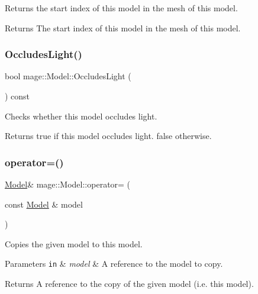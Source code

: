 Returns the start index of this model in the mesh of this model.

\begin{DoxyReturn}{Returns}
The start index of this model in the mesh of this model. 
\end{DoxyReturn}
\hypertarget{classmage_1_1_model_a2ab5542819b80d58f349128a6c0194b5}{}\label{classmage_1_1_model_a2ab5542819b80d58f349128a6c0194b5} 
\subsubsection{\texorpdfstring{Occludes\+Light()}{OccludesLight()}}
{\footnotesize\ttfamily bool mage\+::\+Model\+::\+Occludes\+Light (\begin{DoxyParamCaption}{ }\end{DoxyParamCaption}) const\hspace{0.3cm}{\ttfamily [noexcept]}}

Checks whether this model occludes light.

\begin{DoxyReturn}{Returns}
{\ttfamily true} if this model occludes light. {\ttfamily false} otherwise. 
\end{DoxyReturn}
\hypertarget{classmage_1_1_model_a563515c64ec39cfcda9f6ca37576391b}{}\label{classmage_1_1_model_a563515c64ec39cfcda9f6ca37576391b} 
\subsubsection{\texorpdfstring{operator=()}{operator=()}\hspace{0.1cm}{\footnotesize\ttfamily [1/2]}}
{\footnotesize\ttfamily \hyperlink{classmage_1_1_model}{Model}\& mage\+::\+Model\+::operator= (\begin{DoxyParamCaption}\item[{const \hyperlink{classmage_1_1_model}{Model} \&}]{model }\end{DoxyParamCaption})\hspace{0.3cm}{\ttfamily [delete]}}

Copies the given model to this model.


\begin{DoxyParams}[1]{Parameters}
\mbox{\tt in}  & {\em model} & A reference to the model to copy. \\
\hline
\end{DoxyParams}
\begin{DoxyReturn}{Returns}
A reference to the copy of the given model (i.\+e. this model). 
\end{DoxyReturn}
\hypertarget{classmage_1_1_model_a084e30d15822bfefa79128f30a57cc02}{}\label{classmage_1_1_model_a084e30d15822bfefa79128f30a57cc02} 
